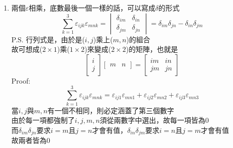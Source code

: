 \documentclass[../main.tex]{subfiles}
\begin{document}
\begin{itemize}
\begin{itemize}
\begin{enumerate}
            \begin{equation}
              \sum_{j=1}^3\sum_{k=1}^3 \varepsilon_{ijk}\varepsilon_{hjk} = 2\delta_{ih}
            \end{equation}
          \item 兩個$\varepsilon$相乘，底數最後一個一樣的話，可以寫成$\delta$的形式
            \begin{equation} 
              \boxed{\sum_{k=1}^3 \varepsilon_{ijk}\varepsilon_{mnk} = 
              \begin{vmatrix}
                \delta_{im} & \delta_{in} \\
                \delta_{jm} & \delta_{jn}
              \end{vmatrix} =\delta_{im}\delta_{jn} - \delta_{in}\delta_{jm}} \label{eq:epsilon_delta_relation_2}
            \end{equation}
            P.S. 行列式是，由於是($i,j$)乘上($m,n$)的組合\\
            故可想成($2\times 1$)乘($1\times 2$)來變成($2\times 2$)的矩陣，也就是
            \begin{equation}
              \begin{bmatrix}
                i \\ j
              \end{bmatrix}
              \begin{bmatrix}
                m & n
              \end{bmatrix}
              = \begin{bmatrix}
                im & in \\
                jm & jn
              \end{bmatrix}
            \end{equation}
            Proof:
            \begin{equation}
              \sum_{k=1}^3 \varepsilon_{ijk}\varepsilon_{mnk} = 
              \varepsilon_{ij1}\varepsilon_{mn1} + \varepsilon_{ij2}\varepsilon_{mn2} + \varepsilon_{ij3}\varepsilon_{mn3} 
            \end{equation}
            當$i,j$與$m,n$有一個不相同，則必定涵蓋了第三個數字\\
            由於每一項都強制了$i,j,m,n$須從兩數字中選出，故每一項皆為0\\
            而$\delta_{im}\delta_{jn}$要求$i=m$且$j=n$才會有值，$\delta_{in}\delta_{jm}$要求$i=n$且$j=m$才會有值\\
            故兩者皆為0\\ 

\end{enumerate}
\end{itemize}
\end{itemize}
\end{document}
